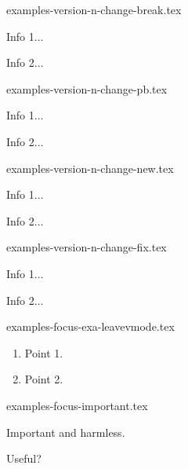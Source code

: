 \begin{filecontents*}[overwrite]{examples-version-n-change-break.tex}
\begin{tdocbreak}
    \item Info 1...
    \item Info 2...
\end{tdocbreak}
\end{filecontents*}


\begin{filecontents*}[overwrite]{examples-version-n-change-pb.tex}
\begin{tdocprob}
    \item Info 1...
    \item Info 2...
\end{tdocprob}
\end{filecontents*}


\begin{filecontents*}[overwrite]{examples-version-n-change-new.tex}
\begin{tdocnew}
    \item Info 1...
    \item Info 2...
\end{tdocnew}
\end{filecontents*}


\begin{filecontents*}[overwrite]{examples-version-n-change-fix.tex}
\begin{tdocfix}
    \item Info 1...
    \item Info 2...
\end{tdocfix}
\end{filecontents*}


\begin{filecontents*}[overwrite]{examples-focus-exa-leavevmode.tex}
\begin{tdocexa}
    \leavevmode

    \begin{enumerate}
        \item Point 1.

        \item Point 2.
    \end{enumerate}
\end{tdocexa}
\end{filecontents*}


\begin{filecontents*}[overwrite]{examples-focus-important.tex}
\begin{tdocimportant}
    Important and harmless.
\end{tdocimportant}

\begin{tdocimportant}
    Useful?
\end{tdocimportant}
\end{filecontents*}


